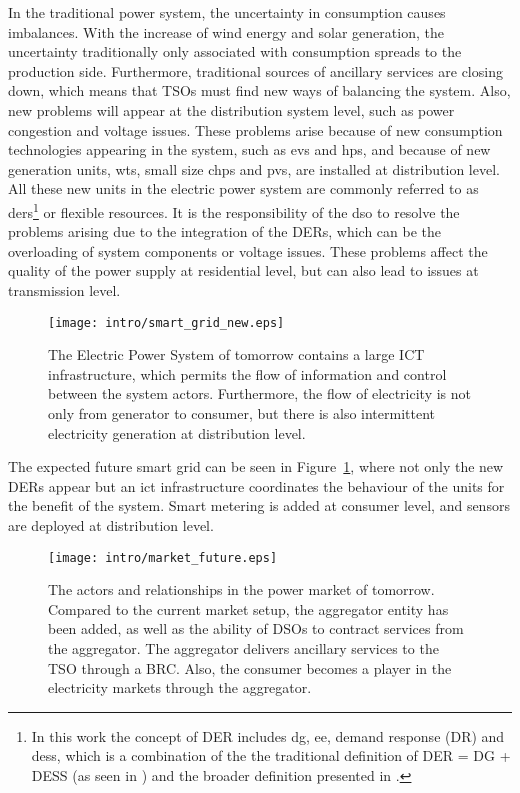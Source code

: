 In the traditional power system, the uncertainty in consumption causes imbalances. With the increase of wind energy and solar generation, the uncertainty traditionally only associated with consumption spreads to the production side. Furthermore, traditional sources of ancillary services are closing down, which means that TSOs must find new ways of balancing the system. Also, new problems will appear at the distribution system level, such as power congestion and voltage issues. These problems arise because of new consumption technologies appearing in the system, such as \glspl{ev} and \glspl{hp}, and because of new generation units, \eg \glspl{wt}, small size \glspl{chp} and \glspl{pv}, are installed at distribution level. All these new units in the electric power system are commonly referred to as \glspl{der}\footnote{In this work the concept of DER includes \gls{dg}, \gls{ee}, demand response (DR) and \gls{dess}, which is a combination of the the traditional definition of DER = DG + DESS (as seen in \eg \cite{nrel2002using}) and the broader definition presented in \cite{nys2014reforming}.} or flexible resources. It is the responsibility of the \gls{dso} to resolve the problems arising due to the integration of the DERs, which can be the overloading of system components or voltage issues. These problems affect the quality of the power supply at residential level, but can also lead to issues at transmission level.
\begin{figure}[ht]
	\centering
	\caption{The Electric Power System of tomorrow contains a large ICT infrastructure, which permits the flow of information and control between the system actors. Furthermore, the flow of electricity is not only from generator to consumer, but there is also intermittent electricity generation at distribution level.}
	\texttt{[image: intro/smart\_grid\_new.eps]}\label{fig:powerfuture}
\end{figure}

The expected future smart grid can be seen in Figure~\ref{fig:powerfuture}, where not only the new DERs appear but an \Gls{ict} infrastructure coordinates the behaviour of the units for the benefit of the system. Smart metering is added at consumer level, and sensors are deployed at distribution level.
\begin{figure*}[htbp!]
	\centering
	\caption{The actors and relationships in the power market of tomorrow. Compared to the current market setup, the aggregator entity has been added, as well as the ability of DSOs to contract services from the aggregator. The aggregator delivers ancillary services to the TSO through a BRC. Also, the consumer becomes a player in the electricity markets through the aggregator.}
	\texttt{[image: intro/market\_future.eps]}\label{fig:marketfuture}
\end{figure*}

